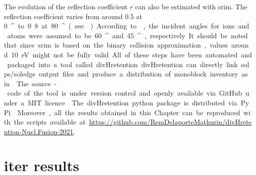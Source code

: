 The evolution of the reflection coefficient $r$ can also be estimated with \gls{srim}.
The reflection coefficient varies from around 0.5 at \SI{0}{^\circ} to 0.8 at \SI{80}{^\circ} (see ).
According to , the incident angles for ions and atoms were assumed to be \SI{60}{^\circ} and \SI{45}{^\circ}, respectively.
It should be noted that since \gls{srim} is based on the binary collision approximation, values around \SI{10}{eV} might not be fully valid.

All of these steps have been automated and packaged into a tool called divHretention.
divHretention can directly link \gls{solps}/\gls{soledge} output files and produce a distribution of \gls{monoblock} \gls{inventory} as in .
The source-code of the tool is under version control and openly available via GitHub under a MIT licence \cite{delaporte-mathurin_irfmdivhretention_2021}.
The divHretention python package is distributed via PyPi \cite{delaporte-mathurin_divhretention_nodate}.
Moreover, all the results obtained in this Chapter can be reproduced with the scripts available at \url{https://github.com/RemDelaporteMathurin/divHretention-Nucl.Fusion-2021}.

\section{\gls{iter} results}

